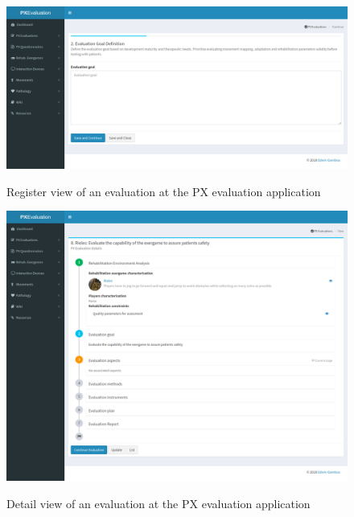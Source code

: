 \begin{figure}[bth]
\myfloatalign
{\includegraphics[width=\linewidth]{gfx/app/evaluationApp1}} \quad
\caption{Register view of an evaluation at the \ac{PX} evaluation application}\label{fig:evaluationApp1}
\end{figure}

\begin{figure}[bth]
\myfloatalign
{\includegraphics[width=\linewidth]{gfx/app/evaluationApp2}} \quad
\caption{Detail view of an evaluation at the \ac{PX} evaluation application}\label{fig:evaluationApp2}
\end{figure}


